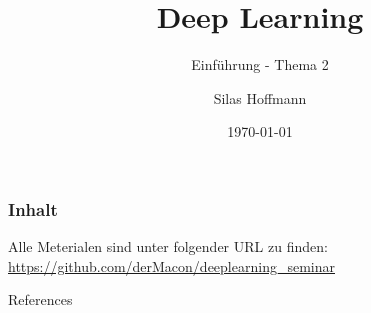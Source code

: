 \documentclass[10pt]{beamer}
\title{Deep Learning}
\subtitle{Einführung - Thema 2}
\date{\today}
\author{Silas Hoffmann}
\institute{Fachhochschule Wedel}
\begin{document}
\maketitle

\begin{frame}
\frametitle{Inhalt}
\tableofcontents
\end{frame}




\maketitle

\appendix




\begin{frame}[standout]


{\normalsize Alle Meterialen sind unter folgender URL zu finden: \\ \url{https://github.com/derMacon/deeplearning_seminar}}
\end{frame}

\begin{frame}[allowframebreaks]{References}
  \nocite{*} 
  
  
\end{frame}
\end{document}
